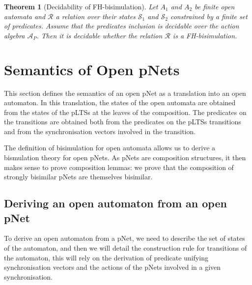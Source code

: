 \documentclass{lmcs}
\newtheorem{theorem}{Theorem}
\begin{document}
\begin{theorem}[Decidability of FH-bisimulation]
Let $A_1$ and $A_2$ be finite open automata
and $\mathcal{R}$ a relation over their states $\mathcal{S}_1$ and
$\mathcal{S}_2$ constrained by a finite set of predicates. Assume that
the predicates inclusion is decidable over  
the action algebra $\mathcal{A}_P$. Then it is decidable whether the relation 
$\mathcal{R}$ is a FH-bisimulation.
  
\end{theorem}



\section{Semantics of Open pNets}
\label{section:op-semantics}

This section defines the semantics of an open pNet as a translation into an open automaton. 
In this translation, the states of the open automata are obtained from
the states of the pLTSs at the leaves of the composition. The
predicates on the transitions are obtained both from the predicates on
the pLTSs transitions and from the synchronisation vectors involved in
the transition. 

The definition of bisimulation for open automata allows us to derive a
bismulation theory for open pNets. As pNets are composition
structures, it then makes sense to prove composition lemmas: we prove
that the composition of strongly bisimilar pNets are themselves
bisimilar. 

\subsection{Deriving an open automaton from an open pNet}
To derive an open automaton from a pNet, we need to describe the set of states of the automaton, and then we will detail the construction rule for transitions of the automaton, this will rely on the derivation of predicate unifying synchronisation vectors and the actions of the pNets involved in a given synchronisation.

\end{document}
